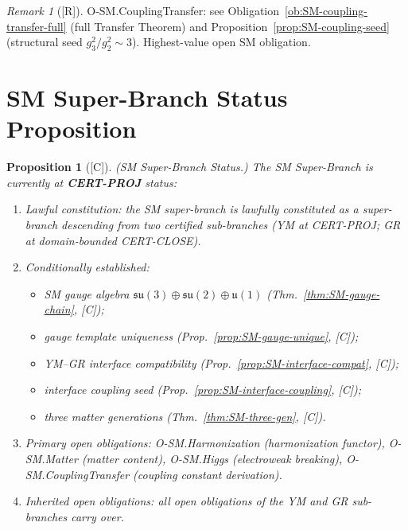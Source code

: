 \documentclass[12pt,oneside]{amsbook}
\theoremstyle{plain}
\newtheorem{proposition}[theorem]{Proposition}
\theoremstyle{definition}
\theoremstyle{remark}
\newtheorem{remark}[theorem]{Remark}
\newcommand{\status}[1]{\textup{[#1]}}
\begin{document}
\begin{remark}[\status{R}]
O-SM.CouplingTransfer: see
Obligation~\ref{ob:SM-coupling-transfer-full} (full Transfer Theorem)
and Proposition~\ref{prop:SM-coupling-seed} (structural seed
$g_3^2/g_2^2 \sim 3$). Highest-value open SM obligation.
\end{remark}

\section{SM Super-Branch Status Proposition}
\label{sec:sm-status}

\begin{proposition}[\status{C}]\label{prop:SM-status}
\textup{(SM Super-Branch Status.)}
The SM Super-Branch is currently at \textbf{CERT-PROJ} status:
\begin{enumerate}[label=\textup{(\roman*)}]
 \item \emph{Lawful constitution}: the SM super-branch is
 lawfully constituted as a super-branch descending from
 two certified sub-branches (YM at CERT-PROJ; GR at
 domain-bounded CERT-CLOSE).
 \item \emph{Conditionally established}:
 \begin{itemize}
 \item SM gauge algebra
 $\mathfrak{su}(3)\oplus\mathfrak{su}(2)
 \oplus\mathfrak{u}(1)$ (Thm.~\ref{thm:SM-gauge-chain},
 [C]);
 \item gauge template uniqueness (Prop.~\ref{prop:SM-gauge-unique},
 [C]);
 \item YM--GR interface compatibility
 (Prop.~\ref{prop:SM-interface-compat}, [C]);
 \item interface coupling seed
 (Prop.~\ref{prop:SM-interface-coupling}, [C]);
 \item three matter generations
 (Thm.~\ref{thm:SM-three-gen}, [C]).
 \end{itemize}
 \item \emph{Primary open obligations}:
 O-SM.Harmonization (harmonization functor),
 O-SM.Matter (matter content),
 O-SM.Higgs (electroweak breaking),
 O-SM.CouplingTransfer (coupling constant derivation).
 \item \emph{Inherited open obligations}: all open obligations
 of the YM and GR sub-branches carry over.
\end{enumerate}
\end{proposition}
\end{document}
